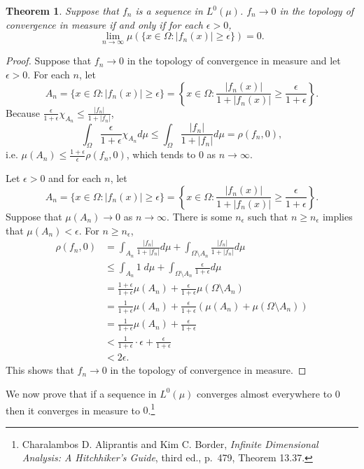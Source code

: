\documentclass{article}
\newtheorem{theorem}{Theorem}
\theoremstyle{definition}
\begin{document}
\begin{theorem}
Suppose that  $f_n$ is  a sequence in $L^0(\mu)$.  $f_n \to 0$ in the topology of convergence
in measure if and only if for each $\epsilon>0$,
\[
\lim_{n \to \infty} \mu\left( \{x \in \Omega: |f_n(x)| \geq \epsilon \} \right) = 0.
\]
\end{theorem}
\begin{proof}
Suppose that $f_n \to 0$ in the topology of convergence in measure and let
$\epsilon>0$. For each $n$,
let
\[
A_n = \{x \in \Omega: |f_n(x)| \geq \epsilon\}=
\left\{ x \in \Omega: \frac{|f_n(x)|}{1+|f_n(x)|} \geq \frac{\epsilon}{1+\epsilon}\right\}.
\]
Because $\frac{\epsilon}{1+\epsilon} \chi_{A_n} \leq 
\frac{|f_n|}{1+|f_n|}$, 
\[
\int_\Omega \frac{\epsilon}{1+\epsilon} \chi_{A_n} d\mu
\leq \int_\Omega \frac{|f_n|}{1+|f_n|} d\mu
=\rho(f_n,0),
\]
i.e. $\mu(A_n) \leq \frac{1+\epsilon}{\epsilon} \rho(f_n,0)$, which tends to
$0$ as $n \to \infty$. 

Let $\epsilon>0$ and for each $n$, let
\[
A_n = \{x \in \Omega: |f_n(x)| \geq \epsilon\}=
\left\{ x \in \Omega: \frac{|f_n(x)|}{1+|f_n(x)|} \geq \frac{\epsilon}{1+\epsilon}\right\}.
\]
Suppose that $\mu(A_n) \to 0$ as $n \to \infty$. There is some $n_\epsilon$ such
that $n \geq n_\epsilon$ implies that $\mu(A_n)<\epsilon$. For $n \geq n_\epsilon$,
\begin{align*}
\rho(f_n,0)&=\int_{A_n} \frac{|f_n|}{1+|f_n|} d\mu
+\int_{\Omega \setminus A_n} \frac{|f_n|}{1+|f_n|} d\mu\\
&\leq \int_{A_n} 1 \; d\mu + \int_{\Omega \setminus A_n} \frac{\epsilon}{1+\epsilon} d\mu\\
&=\frac{1+\epsilon}{1+\epsilon} \mu(A_n)+\frac{\epsilon}{1+\epsilon} \mu(\Omega \setminus A_n)\\
&=\frac{1}{1+\epsilon} \mu(A_n) + \frac{\epsilon}{1+\epsilon} (\mu(A_n)+\mu(\Omega \setminus A_n))\\
&=\frac{1}{1+\epsilon} \mu(A_n)+\frac{\epsilon}{1+\epsilon}\\
&<\frac{1}{1+\epsilon}\cdot \epsilon+\frac{\epsilon}{1+\epsilon}\\
&<2\epsilon.
\end{align*}
This shows that $f_n \to 0$ in the topology of convergence in measure.
\end{proof}


We now prove that if a sequence in
$L^0(\mu)$ converges almost everywhere to $0$ then
it converges in measure to $0$.\footnote{Charalambos D. 
Aliprantis and Kim C. Border, {\em Infinite Dimensional Analysis: A Hitchhiker's Guide}, third ed., p.~479,
Theorem 13.37.} 
\end{document}
